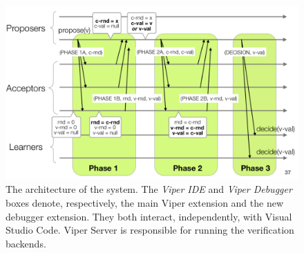 \begin{figure}[htb]
\centering
\includegraphics{img/paxos.png}
\caption[The architecture of the system]{ The architecture of the system. The
  \textit{Viper IDE} and \textit{Viper Debugger} boxes denote, respectively,
  the main Viper extension and the new debugger extension. They both interact,
  independently, with Visual Studio Code. Viper Server is responsible for
  running the verification backends.}
\label{fig:paxos}
\end{figure}